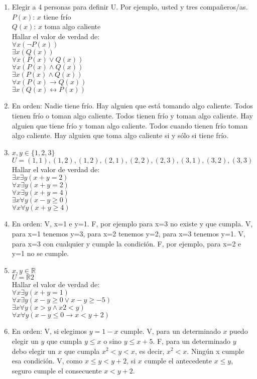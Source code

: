 \documentclass[a4paper]{article}
\newcommand{\answer}{\item[**]}
\newcommand{\then}{\to}
\newcommand{\eq}{\leftrightarrow}
\begin{document}
\begin{enumerate}
\begin{enumerate} [label=(\alph*)]
		\item Elegir a 4 personas para definir U. Por ejemplo, usted y tres compañeros/as. \\
			$P(x)$: $x$ tiene frío \\
			$Q(x)$: $x$ toma algo caliente \\
			Hallar el valor de verdad de: \\
			$\forall x ( \neg P(x) )$  \\
			$\exists x ( Q(x) )$ \\
			$\forall x ( P(x) \lor  Q(x) )$  \\
			$\forall x ( P(x) \land  Q(x) )$ \\
			$\exists x ( P(x) \land  Q(x) )$  \\
			$\forall x ( P(x) \then  Q(x) )$  \\
			$\exists x ( Q(x) \eq P(x) )$  
		\answer En orden: Nadie tiene frío. Hay alguien que está tomando algo caliente. Todos tienen frío o toman algo caliente.  Todos tienen frío y toman algo caliente. Hay alguien que tiene frío y toman algo caliente. Todos cuando tienen frío toman algo caliente. Hay alguien que toma algo caliente si y sólo si tiene frío.

		\item $x,y \in \{1,2,3\}$ \\
			$U = { (1,1), (1,2), (1,2), (2,1), (2,2), (2,3), (3,1), (3,2), (3,3) }$ \\
			Hallar el valor de verdad de: \\
			$\exists x \exists y ( x+y = 2 )$  \\ 
			$\forall x \exists y ( x+y = 2 )$  \\ 
			$\forall x \exists y ( x+y = 4 )$  \\ 
			$\exists x \forall y ( x-y \geq  0 )$  \\ 
			$\forall x \forall y ( x+y \geq  4 )$
		\answer En orden: V, x=1 e y=1. F, por ejemplo para x=3 no existe y que cumpla. V, para x=1 tenemos y=3, para x=2 tenemos y=2, para x=3 tenemos y=1. V, para x=3 con cualquier y cumple la condición. F, por ejemplo, para x=2 e y=1 no se cumple.

		\item $x,y \in  \mathbb{R} $ \\
			$U = \mathbb{R} 2$ \\
			Hallar el valor de verdad de: \\
			$\forall x \exists y ( x+y = 1 ) $   	\\
			$\forall x \exists y ( x-y \geq  0  \lor   x-y \geq  -5 ) $   	\\   	
			$\exists x \forall y ( x > y  \land   x2 < y  )    $    \\
			$\forall x \forall y ( x-y \leq  0  \then   x < y+2  ) $
		\answer En orden: V, si elegimos $y = 1-x$ cumple. V, para un determinado $x$ puedo elegir un $y$ que cumpla $y \leq  x$  o sino $y \leq  x+5$. F, para un determinado $y$ debo elegir un $x$ que cumpla  $x^2 < y < x$, es decir, $x^2 < x$. Ningún x cumple esa condición. V, como $x \leq  y < y+2$, si $x$ cumple el antecedente $x \leq  y$, seguro cumple el consecuente $x < y+2$. 


\end{enumerate}
\end{enumerate}
\end{document}
